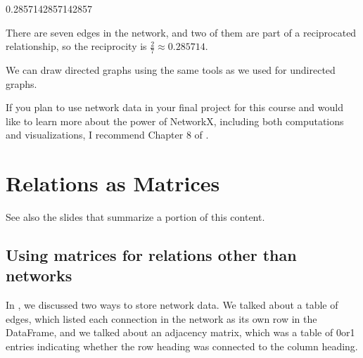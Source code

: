 \documentclass[letterpaper,10pt,english]{jupyterBook}
\begin{document}
\begin{sphinxVerbatim}[commandchars=\\\{\}]
0.2857142857142857
\end{sphinxVerbatim}

\sphinxAtStartPar
There are seven edges in the network, and two of them are part of a reciprocated relationship, so the reciprocity is \(\frac27\approx0.285714\).

\sphinxAtStartPar
We can draw directed graphs using the same tools as we used for undirected graphs.

\begin{sphinxVerbatim}[commandchars=\\\{\}]
    
\end{sphinxVerbatim}

\noindent{}

\sphinxAtStartPar
If you plan to use network data in your final project for this course and would like to learn more about the power of NetworkX, including both computations and visualizations, I recommend Chapter 8 of .


\chapter{Relations as Matrices}
\label{\detokenize{chapter-16-matrices:relations-as-matrices}}\label{\detokenize{chapter-16-matrices::doc}}
\sphinxAtStartPar
See also the slides that summarize a portion of this content.

\sphinxAtStartPar
{}


\section{Using matrices for relations other than networks}
\label{\detokenize{chapter-16-matrices:using-matrices-for-relations-other-than-networks}}
\sphinxAtStartPar
In {\hyperref[\detokenize{chapter-15-networks::doc}]{}}, we discussed two ways to store network data.  We talked about a table of edges, which listed each connection in the network as its own row in the DataFrame, and we talked about an adjacency matrix, which was a table of 0\sphinxhyphen{}or\sphinxhyphen{}1 entries indicating whether the row heading was connected to the column heading.
\end{document}
